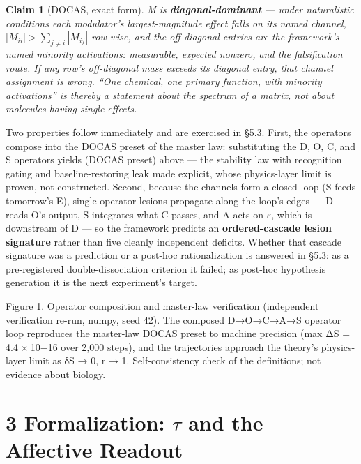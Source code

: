 \documentclass[
]{article}
\begin{document}
\textbf{Claim 1} (DOCAS, exact form). \emph{M is
\textbf{diagonal-dominant} --- under naturalistic conditions each
modulator's largest-magnitude effect falls on its named channel,
\(|M_{ii}| > \sum_{j \neq i} |M_{ij}|\) row-wise, and the off-diagonal
entries are the framework's named minority activations: measurable,
expected nonzero, and the falsification route. If any row's off-diagonal
mass exceeds its diagonal entry, that channel assignment is wrong. ``One
chemical, one primary function, with minority activations'' is thereby a
statement about the spectrum of a matrix, not about molecules having
single effects.}

Two properties follow immediately and are exercised in §5.3. First, the
operators compose into the DOCAS preset of the master law: substituting
the D, O, C, and S operators yields (DOCAS preset) above --- the
stability law with recognition gating and baseline-restoring leak made
explicit, whose physics-layer limit is proven, not constructed. Second,
because the channels form a closed loop (S feeds tomorrow's E),
single-operator lesions propagate along the loop's edges --- D reads O's
output, S integrates what C passes, and A acts on \(\varepsilon\), which
is downstream of D --- so the framework predicts an
\textbf{ordered-cascade lesion signature} rather than five cleanly
independent deficits. Whether that cascade signature was a prediction or
a post-hoc rationalization is answered in §5.3: as a pre-registered
double-dissociation criterion it failed; as post-hoc hypothesis
generation it is the next experiment's target.

Figure 1. Operator composition and master-law verification (independent
verification re-run, numpy, seed 42). The composed D{→}O{→}C{→}A{→}S
operator loop reproduces the master-law DOCAS preset to machine
precision (max {\textbar{}ΔS\textbar{} = 4.4 × 10−16} over 2{,}000
steps), and the trajectories approach the theory's physics-layer limit
as {δS → 0}, {r → 1}. Self-consistency check of the definitions; not
evidence about biology.

\section{\texorpdfstring{3 Formalization: \(\tau\) and the Affective
Readout}{3 Formalization: \textbackslash tau and the Affective Readout}}\label{formalization-tau-and-the-affective-readout}
\end{document}
